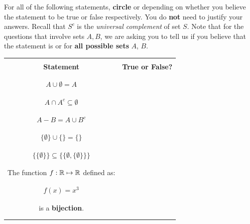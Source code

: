 \documentclass[letterpaper,10pt]{article}
\begin{document}
{\large For all of the following statements,  \textbf{circle} \True{} or \False{} depending on whether you believe the statement to be true or false respectively. You do {\bf not} need to justify your answers. Recall that  {\Large $S^c$} is the {\em universal complement} of set {\Large $S$}.  Note that for the questions that involve sets $A, B$, we are asking you to tell us if you believe that the statement is \True{} or \False{} for {\bf all possible sets} $ A$, $ B$.
} 
\begin{center}
	\setlength{\tabcolsep}{40pt}
	\begin{table}[H]
		\centering 
		\large
		\begin{tabular}{|cc|}    \hline & \\ 
				{\bf \Large Statement} & {\bf  \Large True or False?} \\ & \\ \hline   & \\ 
	 					 {\Large $A \cup \emptyset = A$	} & \truefalse  \\ & \\ \hline & \\
						 {\Large $A \cap A^c \subseteq \emptyset$ 	}& \truefalse \\ & \\ \hline & \\
						{\Large	$A - B = A \cup B^c$ }& \truefalse \\ & \\ \hline & \\ 	
				{\Large		  $\lbrace \emptyset \rbrace \cup \lbrace \rbrace  = \lbrace \rbrace$ }& \truefalse \\ & \\ \hline & \\ 
									{\Large	$\lbrace \lbrace \emptyset \rbrace \rbrace \subseteq \lbrace \lbrace \emptyset, \lbrace \emptyset \rbrace \rbrace \rbrace$ }& \truefalse \\ & \\ \hline & \\ 
					 The function {\Large $f:\mathbb{R}  \mapsto \mathbb{R}$} defined as: & \ \\ & \\ & \\ {\Large $f(x)=x^3$} & \truefalse  \\ & \\ & \\  is a {\bf bijection}. & \\ & \\ \hline & \\ 

\end{tabular}
\end{table}
\end{center}
\end{document}
